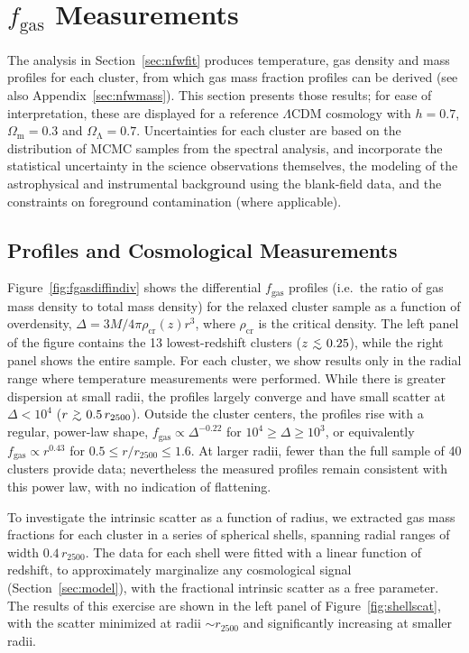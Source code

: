 \documentclass[useAMS,usenatbib,usegraphicx]{mn2e}
\newcommand*{\mysub}[2]{\ensuremath{#1_{\mathrm{#2}}}}
\newcommand*{\Omegam}{\mysub{\Omega}{m}}
\newcommand*{\Omegal}{\mysub{\Omega}{\Lambda}}
\newcommand*{\fgas}{\mysub{f}{gas}}
\newcommand*{\LCDM}{\ensuremath{\Lambda}CDM}
\newcommand*{\rhocr}{\mysub{\rho}{cr}}
\newcommand*{\ltsim}{\ {\raise-.75ex\hbox{$\buildrel<\over\sim$}}\ }
\newcommand*{\gtsim}{\ {\raise-.75ex\hbox{$\buildrel>\over\sim$}}\ }
\newcommand*{\secref}{Section}
\newcommand*{\appref}{Appendix}
\newcommand*{\figref}{Figure}
\begin{document}
\section{\fgas{} Measurements} \label{sec:fgresults}

The analysis in \secref~\ref{sec:nfwfit} produces temperature, gas density and mass profiles for each cluster, from which gas mass fraction profiles can be derived (see also \appref~\ref{sec:nfwmass}). This section presents those results; for ease of interpretation, these are displayed for a reference \LCDM{} cosmology with $h=0.7$, $\Omegam=0.3$ and $\Omegal=0.7$. Uncertainties for each cluster are based on the distribution of MCMC samples from the spectral analysis, and incorporate the statistical uncertainty in the science observations themselves, the modeling of the astrophysical and instrumental background using the blank-field data, and the constraints on foreground contamination (where applicable).

\subsection{Profiles and Cosmological Measurements} \label{sec:fgasmeas}

\figref~\ref{fig:fgasdiffindiv} shows the differential \fgas{} profiles (i.e.\ the ratio of gas mass density to total mass density) for the relaxed cluster sample as a function of overdensity, $\Delta=3M/4\pi \rhocr(z) r^3$, where \rhocr{} is the critical density. The left panel of the figure contains the 13 lowest-redshift clusters ($z\ltsim0.25$), while the right panel shows the entire sample. For each cluster, we show results only in the radial range where temperature measurements were performed. While there is greater dispersion at small radii, the profiles largely converge and have small scatter at $\Delta<10^4$ ($r \gtsim 0.5\,r_{2500}$). Outside the cluster centers, the profiles rise with a regular, power-law shape, $\fgas \propto \Delta^{-0.22}$ for $10^4 \geq \Delta \geq 10^3$, or equivalently $\fgas \propto r^{0.43}$ for $0.5 \leq r/r_{2500} \leq 1.6$. At larger radii, fewer than the full sample of 40 clusters provide data; nevertheless the measured profiles remain consistent with this power law, with no indication of flattening. 

To investigate the intrinsic scatter as a function of radius, we extracted gas mass fractions for each cluster in a series of spherical shells, spanning radial ranges of width $0.4\,r_{2500}$. The data for each shell were fitted with a linear function of redshift, to approximately marginalize any cosmological signal (\secref~\ref{sec:model}), with the fractional intrinsic scatter as a free parameter. The results of this exercise are shown in the left panel of \figref~\ref{fig:shellscat}, with the scatter minimized at radii $\sim r_{2500}$ and significantly increasing at smaller radii.
\end{document}
